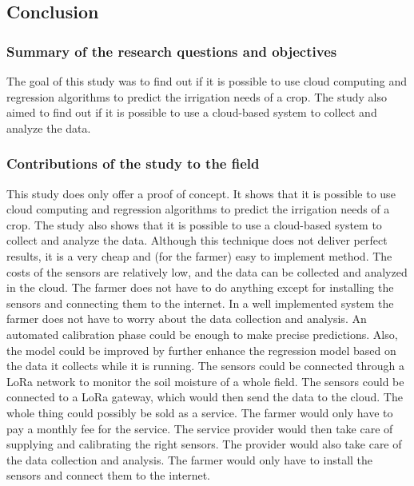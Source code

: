 \documentclass[11pt]{scrartcl} %
\begin{document}
\subsection{Conclusion}
\subsubsection{Summary of the research questions and objectives}
The goal of this study was to find out if it is possible to use cloud computing and regression algorithms to predict the irrigation needs of a crop. The study also aimed to find out if it is possible to use a cloud-based system to collect and analyze the data.

\subsubsection{Contributions of the study to the field}
This study does only offer a proof of concept. It shows that it is possible to use cloud computing and regression algorithms to predict the irrigation needs of a crop. The study also shows that it is possible to use a cloud-based system to collect and analyze the data.
\newline Although this technique does not deliver perfect results, it is a very cheap and (for the farmer) easy to implement method. The costs of the sensors are relatively low, and the data can be collected and analyzed in the cloud. The farmer does not have to do anything except for installing the sensors and connecting them to the internet. In a well implemented system the farmer does not have to worry about the data collection and analysis. An automated calibration phase could be enough to make precise predictions. Also, the model could be improved by further enhance the regression model based on the data it collects while it is running.
\newline The sensors could be connected through a LoRa network to monitor the soil moisture of a whole field. The sensors could be connected to a LoRa gateway, which would then send the data to the cloud.
\newline The whole thing could possibly be sold as a service. The farmer would only have to pay a monthly fee for the service. The service provider would then take care of supplying and calibrating the right sensors. The provider would also take care of the data collection and analysis. The farmer would only have to install the sensors and connect them to the internet.
\end{document}
